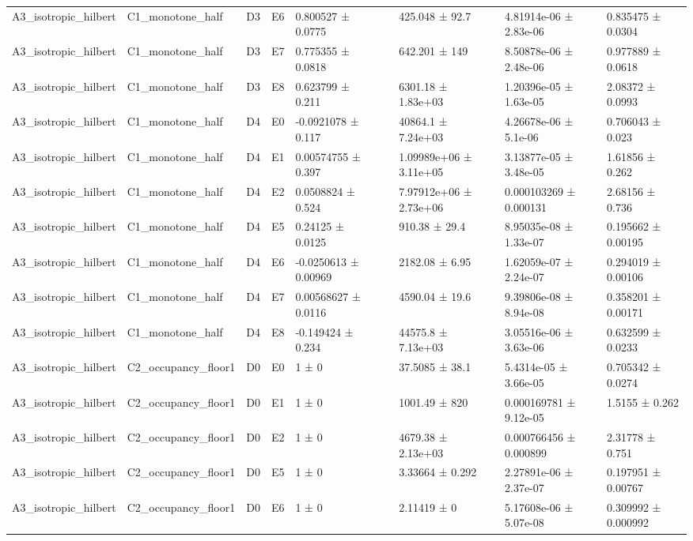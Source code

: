 \begin{table}
\begin{tabular}{lllllllll}
A3\_isotropic\_hilbert & C1\_monotone\_half & D3 & E6 & 0.800527 ± 0.0775 &  & 425.048 ± 92.7 & 4.81914e-06 ± 2.83e-06 & 0.835475 ± 0.0304 \\
A3\_isotropic\_hilbert & C1\_monotone\_half & D3 & E7 & 0.775355 ± 0.0818 &  & 642.201 ± 149 & 8.50878e-06 ± 2.48e-06 & 0.977889 ± 0.0618 \\
A3\_isotropic\_hilbert & C1\_monotone\_half & D3 & E8 & 0.623799 ± 0.211 &  & 6301.18 ± 1.83e+03 & 1.20396e-05 ± 1.63e-05 & 2.08372 ± 0.0993 \\
A3\_isotropic\_hilbert & C1\_monotone\_half & D4 & E0 & -0.0921078 ± 0.117 &  & 40864.1 ± 7.24e+03 & 4.26678e-06 ± 5.1e-06 & 0.706043 ± 0.023 \\
A3\_isotropic\_hilbert & C1\_monotone\_half & D4 & E1 & 0.00574755 ± 0.397 &  & 1.09989e+06 ± 3.11e+05 & 3.13877e-05 ± 3.48e-05 & 1.61856 ± 0.262 \\
A3\_isotropic\_hilbert & C1\_monotone\_half & D4 & E2 & 0.0508824 ± 0.524 &  & 7.97912e+06 ± 2.73e+06 & 0.000103269 ± 0.000131 & 2.68156 ± 0.736 \\
A3\_isotropic\_hilbert & C1\_monotone\_half & D4 & E5 & 0.24125 ± 0.0125 &  & 910.38 ± 29.4 & 8.95035e-08 ± 1.33e-07 & 0.195662 ± 0.00195 \\
A3\_isotropic\_hilbert & C1\_monotone\_half & D4 & E6 & -0.0250613 ± 0.00969 &  & 2182.08 ± 6.95 & 1.62059e-07 ± 2.24e-07 & 0.294019 ± 0.00106 \\
A3\_isotropic\_hilbert & C1\_monotone\_half & D4 & E7 & 0.00568627 ± 0.0116 &  & 4590.04 ± 19.6 & 9.39806e-08 ± 8.94e-08 & 0.358201 ± 0.00171 \\
A3\_isotropic\_hilbert & C1\_monotone\_half & D4 & E8 & -0.149424 ± 0.234 &  & 44575.8 ± 7.13e+03 & 3.05516e-06 ± 3.63e-06 & 0.632599 ± 0.0233 \\
A3\_isotropic\_hilbert & C2\_occupancy\_floor1 & D0 & E0 & 1 ± 0 &  & 37.5085 ± 38.1 & 5.4314e-05 ± 3.66e-05 & 0.705342 ± 0.0274 \\
A3\_isotropic\_hilbert & C2\_occupancy\_floor1 & D0 & E1 & 1 ± 0 &  & 1001.49 ± 820 & 0.000169781 ± 9.12e-05 & 1.5155 ± 0.262 \\
A3\_isotropic\_hilbert & C2\_occupancy\_floor1 & D0 & E2 & 1 ± 0 &  & 4679.38 ± 2.13e+03 & 0.000766456 ± 0.000899 & 2.31778 ± 0.751 \\
A3\_isotropic\_hilbert & C2\_occupancy\_floor1 & D0 & E5 & 1 ± 0 &  & 3.33664 ± 0.292 & 2.27891e-06 ± 2.37e-07 & 0.197951 ± 0.00767 \\
A3\_isotropic\_hilbert & C2\_occupancy\_floor1 & D0 & E6 & 1 ± 0 &  & 2.11419 ± 0 & 5.17608e-06 ± 5.07e-08 & 0.309992 ± 0.000992 \\

\end{tabular}
\end{table}
